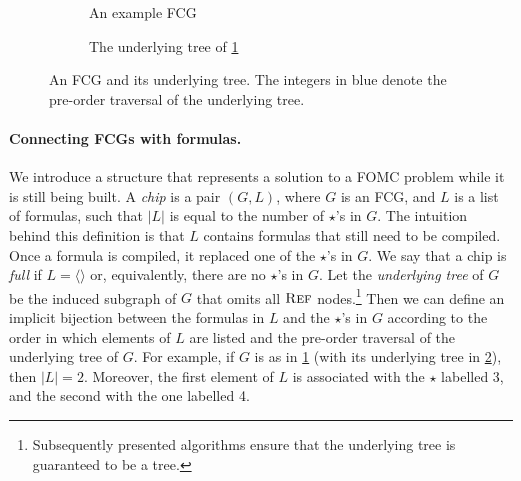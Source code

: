 \begin{figure}[t]
  \centering
  \begin{subfigure}{0.49\textwidth}
    \centering
    \caption{An example FCG}\label{fig:smallexample1}
  \end{subfigure}
  \begin{subfigure}{0.49\textwidth}
    \centering
    \caption{The underlying tree of \cref{fig:smallexample1}}\label{fig:smallexample2}
  \end{subfigure}
  \caption{An FCG and its underlying tree. The integers in blue denote the
    pre-order traversal of the underlying tree.}\label{fig:ordering}
\end{figure}

\paragraph*{Connecting FCGs with formulas.} We introduce a structure that
represents a solution to a FOMC problem while it is still being built. A
\emph{chip} is a pair $(G, L)$, where $G$ is an FCG, and $L$ is a list of
formulas, such that $|L|$ is equal to the number of $\star$'s in $G$. The
intuition behind this definition is that $L$ contains formulas that still need
to be compiled. Once a formula is compiled, it replaced one of the $\star$'s in
$G$. We say that a chip is \emph{full} if $L = \langle \rangle$ or,
equivalently, there are no $\star$'s in $G$. Let the \emph{underlying tree} of
$G$ be the induced subgraph of $G$ that omits all $\operatorname{\textsc{Ref}}$
nodes.\footnote{Subsequently presented algorithms ensure that the underlying
  tree is guaranteed to be a tree.} Then we can define an implicit bijection
between the formulas in $L$ and the $\star$'s in $G$ according to the order in
which elements of $L$ are listed and the pre-order traversal of the underlying
tree of $G$. For example, if $G$ is as in \cref{fig:smallexample1} (with its
underlying tree in \cref{fig:smallexample2}), then $|L| = 2$. Moreover, the
first element of $L$ is associated with the $\star$ labelled 3, and the second
with the one labelled 4.

